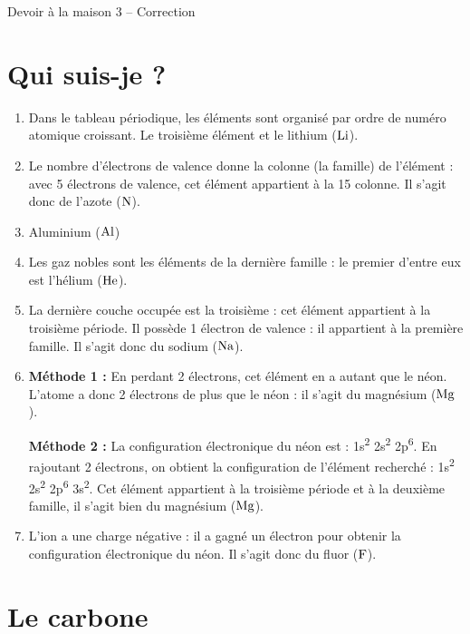 \documentclass[12pt,a4paper,fleqn]{article}
\begin{document}
\begin{header}
Devoir à la maison 3 -- Correction
\end{header}

\section*{Qui suis-je ?}

\begin{enumerate}
\item Dans le tableau périodique, les éléments sont organisé par ordre de numéro atomique croissant.
Le troisième élément et le lithium ($\rm{Li}$).

\item Le nombre d'électrons de valence donne la colonne (la famille) de l'élément : avec 5 électrons de valence, cet élément appartient à la 15 colonne.
Il s'agit donc de l'azote ($\rm{N}$).

\item Aluminium ($\rm{Al}$)

\item Les gaz nobles sont les éléments de la dernière famille : le premier d'entre eux est l'hélium ($\rm{He}$).

\item La dernière couche occupée est la troisième : cet élément appartient à la troisième période.
Il possède 1 électron de valence : il appartient à la première famille.
Il s'agit donc du sodium ($\rm{Na}$).

\item \textbf{Méthode 1 :} En perdant 2 électrons, cet élément en a autant que le néon.
L'atome a donc 2 électrons de plus que le néon : il s'agit du magnésium ($\rm{Mg}$).

\textbf{Méthode 2 :} La configuration électronique du néon est : 1s\textsuperscript{2} 2s\textsuperscript{2} 2p\textsuperscript{6}.
En rajoutant 2 électrons, on obtient la configuration de l'élément recherché : 1s\textsuperscript{2} 2s\textsuperscript{2} 2p\textsuperscript{6} 3s\textsuperscript{2}.
Cet élément appartient à la troisième période et à la deuxième famille, il s'agit bien du magnésium ($\rm{Mg}$).

\item L'ion a une charge négative : il a gagné un électron pour obtenir la configuration électronique du néon.
Il s'agit donc du fluor ($\rm{F}$).
\end{enumerate}

\section*{Le carbone}
\end{document}
